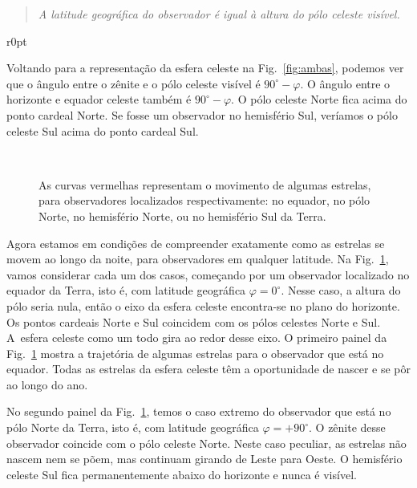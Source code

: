\begin{quote}
\textit{A latitude geográfica do observador é igual à altura do pólo celeste visível.}
\end{quote}

\begin{wrapfigure}[18]{r}{0pt}

\caption{Esfera celeste mostrando o horizonte e o equador celeste.}
\label{fig:ambas}
\end{wrapfigure}

Voltando para a representação da esfera celeste na Fig.~\ref{fig:ambas}, podemos ver que o ângulo entre o zênite e o pólo celeste visível é $90^{\circ}-\varphi$. O ângulo entre o horizonte e equador celeste também é $90^{\circ}-\varphi$. O pólo celeste Norte fica acima do ponto cardeal Norte. Se fosse um observador no hemisfério Sul, veríamos o pólo celeste Sul acima do ponto cardeal Sul.

\begin{figure}
%
\\
%
 
\caption{As curvas vermelhas representam o movimento de algumas estrelas, para observadores localizados respectivamente: no equador, no pólo Norte, no hemisfério Norte, ou no hemisfério Sul da Terra.}
\label{fig:no}
\end{figure}

Agora estamos em condições de compreender exatamente como as estrelas se movem ao longo da noite, para observadores em qualquer latitude. Na Fig.~\ref{fig:no}, vamos considerar cada um dos casos, começando por um observador localizado no equador da Terra, isto é, com latitude geográfica $\varphi=0^{\circ}$. Nesse caso, a altura do pólo seria nula, então o eixo da esfera celeste encontra-se no plano do horizonte. Os pontos cardeais Norte e Sul coincidem com os pólos celestes Norte e Sul. A~esfera celeste como um todo gira ao redor desse eixo. O primeiro painel da Fig.~\ref{fig:no} mostra a trajetória de algumas estrelas para o observador que está no equador. Todas as estrelas da esfera celeste têm a oportunidade de nascer e se pôr ao longo do ano.

No segundo painel da Fig.~\ref{fig:no}, temos o caso extremo do observador que está no pólo Norte da Terra, isto é, com latitude geográfica $\varphi=+90^{\circ}$. O zênite desse observador coincide com o pólo celeste Norte. Neste caso peculiar, as estrelas não nascem nem se põem, mas continuam girando de Leste para Oeste. O hemisfério celeste Sul fica permanentemente abaixo do horizonte e nunca é visível.


